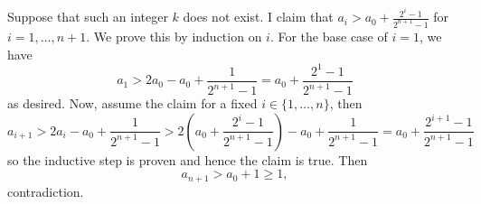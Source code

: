 Suppose that such an integer $k$ does not exist. I claim that $a_i>a_0+\frac{2^i-1}{2^{n+1}-1}$ for $i=1,\ldots,n+1$. We prove this by induction on $i$. For the base case of $i=1$, we have
\[
	a_1>2a_0-a_0+\frac{1}{2^{n+1}-1}=a_0+\frac{2^1-1}{2^{n+1}-1}
\]
as desired. Now, assume the claim for a fixed $i\in\{1,\ldots,n\}$, then
\[
	a_{i+1}>2a_i-a_0+\frac{1}{2^{n+1}-1}>2\left(a_0+\frac{2^i-1}{2^{n+1}-1}\right)-a_0+\frac{1}{2^{n+1}-1}=a_0+\frac{2^{i+1}-1}{2^{n+1}-1}
\]
so the inductive step is proven and hence the claim is true. Then
\[
	a_{n+1}>a_0+1\geq1,
\]
contradiction.
